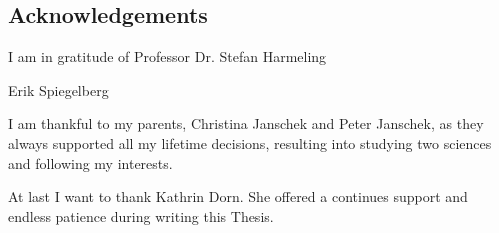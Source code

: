 \begin{titlepage}
\vspace*{\fill}
\section*{Acknowledgements}

I am in gratitude of Professor Dr. Stefan Harmeling


Erik Spiegelberg

I am thankful to my parents, Christina Janschek and Peter Janschek, as they always supported all my lifetime decisions, resulting into studying two sciences and following my interests.

At last I want to thank Kathrin Dorn. She offered a continues support and endless patience during writing this Thesis.

\vspace*{\fill}
\end{titlepage}
